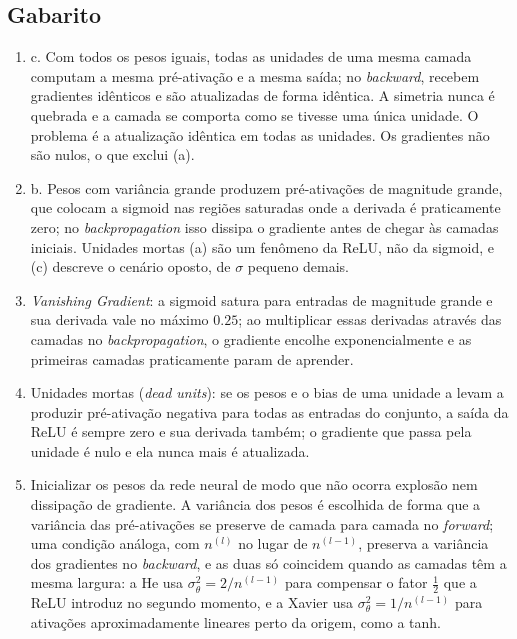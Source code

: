 \documentclass{dlproblemset}
\begin{document}
\subsection*{Gabarito}
\color{blue}
\begin{enumerate}[1)]

    \item c. Com todos os pesos iguais, todas as unidades de uma mesma camada computam a mesma pré-ativação e a mesma saída; no \textit{backward}, recebem gradientes idênticos e são atualizadas de forma idêntica. A simetria nunca é quebrada e a camada se comporta como se tivesse uma única unidade. O problema é a atualização idêntica em todas as unidades. Os gradientes não são nulos, o que exclui (a).

    \item b. Pesos com variância grande produzem pré-ativações de magnitude grande, que colocam a sigmoid nas regiões saturadas onde a derivada é praticamente zero; no \textit{backpropagation} isso dissipa o gradiente antes de chegar às camadas iniciais. Unidades mortas (a) são um fenômeno da ReLU, não da sigmoid, e (c) descreve o cenário oposto, de $\sigma$ pequeno demais.

    \item \textit{Vanishing Gradient}: a sigmoid satura para entradas de magnitude grande e sua derivada vale no máximo $0.25$; ao multiplicar essas derivadas através das camadas no \textit{backpropagation}, o gradiente encolhe exponencialmente e as primeiras camadas praticamente param de aprender.

    \item Unidades mortas (\textit{dead units}): se os pesos e o bias de uma unidade a levam a produzir pré-ativação negativa para todas as entradas do conjunto, a saída da ReLU é sempre zero e sua derivada também; o gradiente que passa pela unidade é nulo e ela nunca mais é atualizada.

    \item Inicializar os pesos da rede neural de modo que não ocorra explosão nem dissipação de gradiente. A variância dos pesos é escolhida de forma que a variância das pré-ativações se preserve de camada para camada no \textit{forward}; uma condição análoga, com $n^{(l)}$ no lugar de $n^{(l-1)}$, preserva a variância dos gradientes no \textit{backward}, e as duas só coincidem quando as camadas têm a mesma largura: a He usa $\sigma_\theta^2 = 2/n^{(l-1)}$ para compensar o fator $\frac{1}{2}$ que a ReLU introduz no segundo momento, e a Xavier usa $\sigma_\theta^2 = 1/n^{(l-1)}$ para ativações aproximadamente lineares perto da origem, como a tanh.


\end{enumerate}
\end{document}
